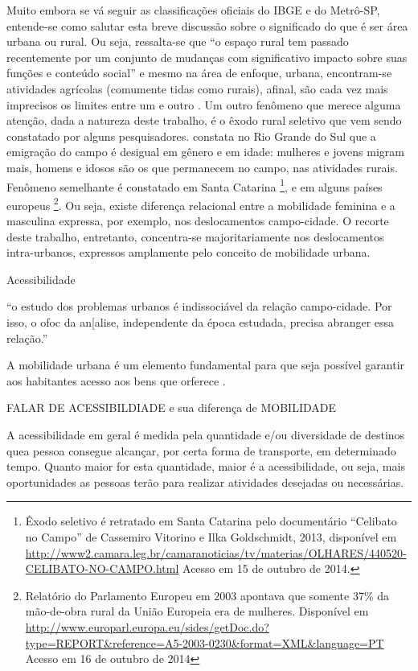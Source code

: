 Muito embora se vá seguir as classificações oficiais do IBGE e do Metrô-SP, entende-se como salutar esta breve discussão sobre o significado do que é ser área urbana ou rural. Ou seja, ressalta-se que “o espaço rural tem passado recentemente por um conjunto de mudanças com significativo impacto sobre suas funções e conteúdo social” \cite{(MARQUES2002, p. 96)} e mesmo na área de enfoque, urbana, encontram-se atividades agrícolas (comumente tidas como rurais), afinal, são cada vez mais imprecisos os limites entre um e outro \cite{(MINGIONE1987)}. Um outro fenômeno que merece alguma atenção, dada a natureza deste trabalho, é o êxodo rural seletivo que vem sendo constatado por alguns pesquisadores. \cite{(RAUBER2010)} constata no Rio Grande do Sul que a emigração do campo é desigual em gênero e em idade: mulheres e jovens migram mais, homens e idosos são os que permanecem no campo, nas atividades rurais. Fenômeno semelhante é constatado em Santa Catarina
\footnote{Êxodo seletivo é retratado em Santa Catarina pelo documentário ``Celibato no Campo'' de Cassemiro Vitorino e Ilka Goldschmidt, 2013, disponível em \url{http://www2.camara.leg.br/camaranoticias/tv/materias/OLHARES/440520-CELIBATO-NO-CAMPO.html} Acesso em 15 de outubro de 2014.},
e em alguns países europeus
\footnote{Relatório do Parlamento Europeu em 2003 apontava que somente 37\% da mão-de-obra rural da União Europeia era de mulheres. Disponível em \url{http://www.europarl.europa.eu/sides/getDoc.do?type=REPORT&reference=A5-2003-0230&format=XML&language=PT} Acesso em  16 de outubro de 2014}. Ou seja, existe diferença relacional entre a mobilidade feminina e a masculina expressa, por exemplo, nos deslocamentos campo-cidade.
O recorte deste trabalho, entretanto, concentra-se majoritariamente nos deslocamentos intra-urbanos, expressos amplamente pelo conceito de mobilidade urbana. 


Acessibilidade


``o estudo dos problemas urbanos é indissociável da relação campo-cidade. Por isso, o ofoc da an[alise, independente da época estudada, precisa abranger essa relação.'' \cite[p.154]{FREITAG2007}

A mobilidade urbana é um elemento fundamental para que seja possível garantir aos habitantes acesso aos bens que orferece \cite{IEMA2010}.

FALAR DE ACESSIBILDIADE e sua diferença de MOBILIDADE
\begin{citacao}
A acessibilidade em geral é medida pela quantidade e/ou diversidade de destinos quea pessoa consegue alcançar, por certa forma de transporte, em determinado tempo. Quanto maior for esta quantidade, maior é a acessibilidade, ou seja, mais oportunidades as pessoas terão para realizar atividades desejadas ou necessárias. \cite[p.42]{VASCONCELLOS2012}
\end{citacao}

